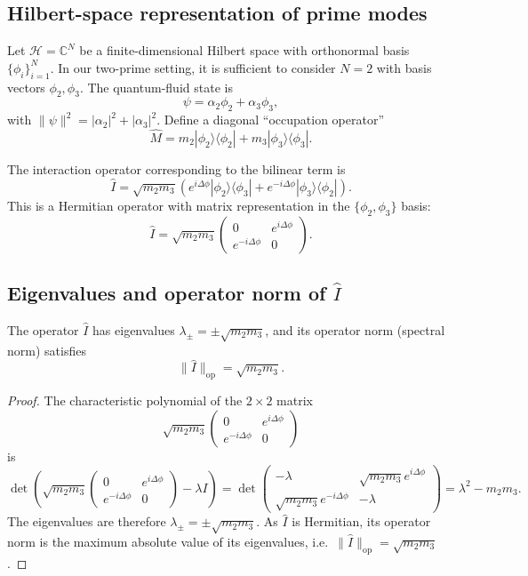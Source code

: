 \documentclass[11pt]{article}
\begin{document}
\subsection{Hilbert-space representation of prime modes}

Let \(\mathcal{H} = \mathbb{C}^N\) be a finite-dimensional Hilbert space with orthonormal basis \(\{\phi_i\}_{i=1}^N\). In our two-prime setting, it is sufficient to consider \(N=2\) with basis vectors \(\phi_2,\phi_3\). The quantum-fluid state is
\[
\psi = \alpha_2 \phi_2 + \alpha_3 \phi_3,
\]
with \(\|\psi\|^2 = |\alpha_2|^2 + |\alpha_3|^2\). Define a diagonal ``occupation operator''
\[
\hat{M} = m_2 |\phi_2\rangle\langle\phi_2| + m_3 |\phi_3\rangle\langle\phi_3|.
\]

The interaction operator corresponding to the bilinear term is
\[
\hat{I} = \sqrt{m_2 m_3}\left(e^{i\Delta\phi} |\phi_2\rangle\langle\phi_3|
+ e^{-i\Delta\phi} |\phi_3\rangle\langle\phi_2|\right).
\]
This is a Hermitian operator with matrix representation in the \(\{\phi_2,\phi_3\}\) basis:
\[
\hat{I} =
\sqrt{m_2 m_3}
\begin{pmatrix}
0 & e^{i\Delta\phi}\\
e^{-i\Delta\phi} & 0
\end{pmatrix}.
\]

\subsection{Eigenvalues and operator norm of \texorpdfstring{\(\hat{I}\)}{I}}

\begin{lemma}
The operator \(\hat{I}\) has eigenvalues \(\lambda_{\pm} = \pm\sqrt{m_2 m_3}\), and its operator norm (spectral norm) satisfies
\[
\|\hat{I}\|_{\mathrm{op}} = \sqrt{m_2 m_3}.
\]
\end{lemma}

\begin{proof}
The characteristic polynomial of the \(2\times 2\) matrix
\[
\sqrt{m_2 m_3}
\begin{pmatrix}
0 & e^{i\Delta\phi}\\
e^{-i\Delta\phi} & 0
\end{pmatrix}
\]
is
\[
\det\left(
\sqrt{m_2 m_3}
\begin{pmatrix}
0 & e^{i\Delta\phi}\\
e^{-i\Delta\phi} & 0
\end{pmatrix} - \lambda I
\right)
= \det
\begin{pmatrix}
-\lambda & \sqrt{m_2m_3} e^{i\Delta\phi}\\
\sqrt{m_2m_3} e^{-i\Delta\phi} & -\lambda
\end{pmatrix}
= \lambda^2 - m_2 m_3.
\]
The eigenvalues are therefore \(\lambda_\pm = \pm\sqrt{m_2 m_3}\). As \(\hat{I}\) is Hermitian, its operator norm is the maximum absolute value of its eigenvalues, i.e.\ \(\|\hat{I}\|_{\mathrm{op}} = \sqrt{m_2 m_3}\).
\end{proof}
\end{document}
